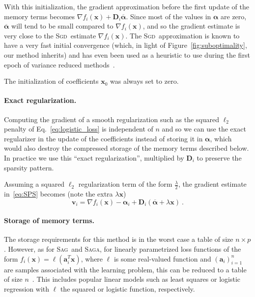 \documentclass{article}
\newcommand{\SAGA}{\textsc{Saga}}
\newcommand{\SAG}{\textsc{Sag}}
\newcommand{\SGD}{\textsc{Sgd}}
\def\xx{{\boldsymbol x}}
\def\vv{{\boldsymbol v}}
\def\DD{{\boldsymbol D}}
\def\balpha{{\boldsymbol \alpha}}
\begin{document}
With this initialization, the gradient approximation before the first update of the memory terms becomes $\nabla f_i(\xx) + \DD_i \overline{\balpha}$. Since most of the values in $\balpha$ are zero, $\overline{\balpha}$ will tend to be small compared to $\nabla f_i(\xx)$, and so the gradient estimate is very close to the \SGD\ estimate $\nabla f_i(\xx)$. The \SGD\ approximation is known to have a very fast initial convergence (which, in light of Figure~\ref{fig:suboptimality}, our method inherits) and has even been used as a heuristic to use during the first epoch of variance reduced methods~\citep{schmidt2016minimizing}.

The initialization of coefficients $\xx_0$ was always set to zero.

\paragraph{Exact regularization.} Computing the gradient of a smooth regularization such as the squared $\ell_2$ penalty of Eq.~\eqref{eq:logistic_loss} is independent of $n$ and so we can use the exact regularizer in the update of the coefficients instead of storing it in $\balpha$, which would also destroy the compressed storage of the memory terms described below. In practice we use this ``exact regularization'', multiplied by $\DD_i$ to preserve the sparsity pattern. 

Assuming a squared $\ell_2$ regularization term of the form $\frac{\lambda}{2}$, the gradient estimate in~\eqref{eq:SPS} becomes (note the extra $\lambda \xx$)
\begin{equation}
\vv_i = \nabla f_i(\xx) - \balpha_i + \DD_i (\overline\balpha + \lambda \xx)~.
\end{equation}


\paragraph{Storage of memory terms.}
The storage requirements for this method is in the worst case a table of size $n \times p$.
However, as for \SAG\ and \SAGA, for linearly parametrized loss functions of the form $f_i(\xx) = \ell(\boldsymbol a_i^T \xx)$, where $\ell$ is some real-valued function and $(\boldsymbol a_i)_{i=1}^n$ are samples associated with the learning problem, 
this can be reduced to a table of size $n$~\citep[\S 4.1]{schmidt2016minimizing}. 
This includes popular linear models such as least squares or logistic regression with $\ell$ the squared or logistic function, respectively.
\end{document}
